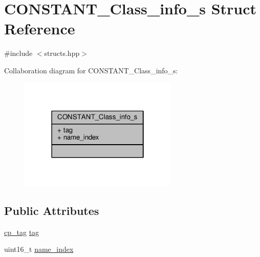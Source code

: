 \hypertarget{structCONSTANT__Class__info__s}{\section{C\+O\+N\+S\+T\+A\+N\+T\+\_\+\+Class\+\_\+info\+\_\+s Struct Reference}
\label{structCONSTANT__Class__info__s}
}


{\ttfamily \#include $<$structs.\+hpp$>$}



Collaboration diagram for C\+O\+N\+S\+T\+A\+N\+T\+\_\+\+Class\+\_\+info\+\_\+s\+:\nopagebreak
\begin{figure}[H]
\begin{center}
\leavevmode
\includegraphics[width=214pt]{structCONSTANT__Class__info__s__coll__graph}
\end{center}
\end{figure}
\subsection*{Public Attributes}
\begin{DoxyCompactItemize}
\item 
\hyperlink{structs_8hpp_a17947ec3f3c1f2392eabd36c1ba5fec6}{cp\+\_\+tag} \hyperlink{structCONSTANT__Class__info__s_ae27fd46fb88a7d58404f0d0b29babc3e}{tag}
\item 
uint16\+\_\+t \hyperlink{structCONSTANT__Class__info__s_a3e852021d398529ee470dc916998fa6a}{name\+\_\+index}
\end{DoxyCompactItemize}


